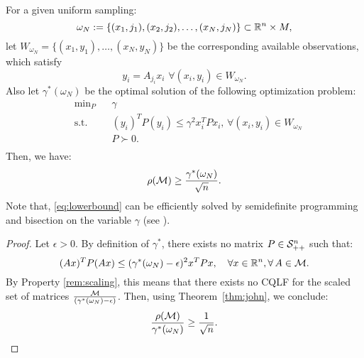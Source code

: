 \begin{theorem}\label{thm:lowerbound}
For a given uniform sampling: $$\omega_N := \{(x_1, j_1), (x_2, j_2), \ldots, (x_N, j_N)\} \subset \mathbb{R}^n \times M,$$ let $W_{\omega_N}=\{(x_1,y_1), \ldots,(x_N,y_N)\}$ be the corresponding available observations, which satisfy $$y_i= A_{j_i}x_i\,\, \forall (x_i, y_i) \in W_{\omega_N}.$$
Also let $\gamma^*(\omega_N)$ be the optimal solution of the following optimization problem:
\begin{equation}\label{eq:lowerbound}
\begin{aligned}
& \text{min}_P & & \gamma \\
& \text{s.t.} 
&  & (y_i)^T P (y_i) \leq \gamma^2 x_i^TPx_i,\,  \forall (x_i, y_i) \in W_{\omega_N}\\
& && P \succ 0. \\
\end{aligned}
\end{equation}
Then, we have:
$$\rho(\mathcal{M}) \geq \frac{\gamma^*(\omega_N)}{\sqrt{n}}.$$ Note that, \eqref{eq:lowerbound} can be efficiently solved by semidefinite programming and bisection on the variable $\gamma$ (see \cite{boyd}).
\end{theorem}
\begin{proof}
Let $\epsilon >0$. By definition of $\gamma^*$,  there exists no matrix $P \in \mathcal{S}^n_{++}$ such that:
\begin{equation*}(Ax)^T P (Ax) \leq (\gamma^*(\omega_N) -\epsilon)^2x^TPx,\quad \forall x \in \mathbb{R}^n, \forall\, A \in \mathcal{M}.
\end{equation*}
By Property \ref{rem:scaling}, this means that there exists no CQLF for the scaled set of matrices $\frac{\mathcal{M}}{(\gamma^*(\omega_N)-\epsilon)}$. Then, using Theorem~\ref{thm:john}, we conclude:
\begin{equation*}\frac{\rho(\mathcal{M})}{\gamma^*(\omega_N)} \geq \frac{1}{\sqrt{n}}.\end{equation*}
\end{proof}
